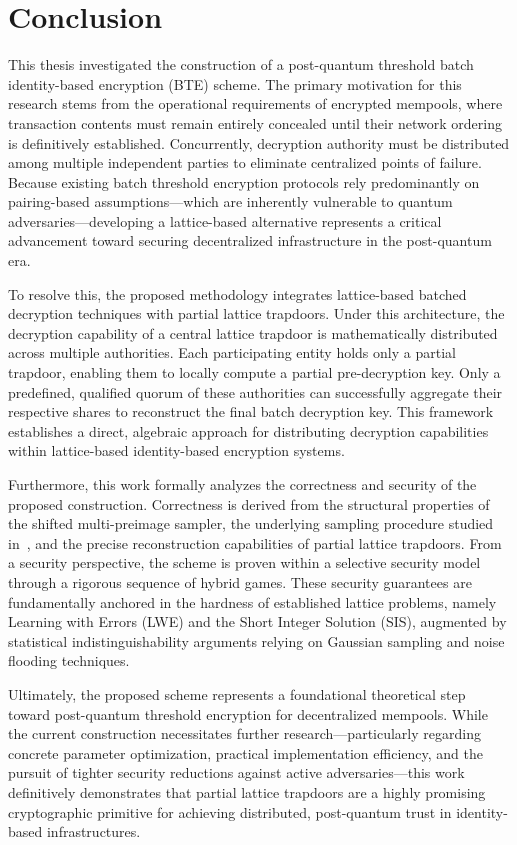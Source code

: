 \section{Conclusion}

This thesis investigated the construction of a post-quantum threshold batch identity-based encryption (BTE) scheme. The primary motivation for this research stems from the operational requirements of encrypted mempools, where transaction contents must remain entirely concealed until their network ordering is definitively established. Concurrently, decryption authority must be distributed among multiple independent parties to eliminate centralized points of failure. Because existing batch threshold encryption protocols rely predominantly on pairing-based assumptions—which are inherently vulnerable to quantum adversaries—developing a lattice-based alternative represents a critical advancement toward securing decentralized infrastructure in the post-quantum era.

To resolve this, the proposed methodology integrates lattice-based batched decryption techniques with partial lattice trapdoors. Under this architecture, the decryption capability of a central lattice trapdoor is mathematically distributed across multiple authorities. Each participating entity holds only a partial trapdoor, enabling them to locally compute a partial pre-decryption key. Only a predefined, qualified quorum of these authorities can successfully aggregate their respective shares to reconstruct the final batch decryption key. This framework establishes a direct, algebraic approach for distributing decryption capabilities within lattice-based identity-based encryption systems.

Furthermore, this work formally analyzes the correctness and security of the proposed construction. Correctness is derived from the structural properties of the shifted multi-preimage sampler, the underlying sampling procedure studied in~\cite{EC:ABB10}, and the precise reconstruction capabilities of partial lattice trapdoors. From a security perspective, the scheme is proven within a selective security model through a rigorous sequence of hybrid games. These security guarantees are fundamentally anchored in the hardness of established lattice problems, namely Learning with Errors (LWE) and the Short Integer Solution (SIS), augmented by statistical indistinguishability arguments relying on Gaussian sampling and noise flooding techniques.

Ultimately, the proposed scheme represents a foundational theoretical step toward post-quantum threshold encryption for decentralized mempools. While the current construction necessitates further research—particularly regarding concrete parameter optimization, practical implementation efficiency, and the pursuit of tighter security reductions against active adversaries—this work definitively demonstrates that partial lattice trapdoors are a highly promising cryptographic primitive for achieving distributed, post-quantum trust in identity-based infrastructures.

